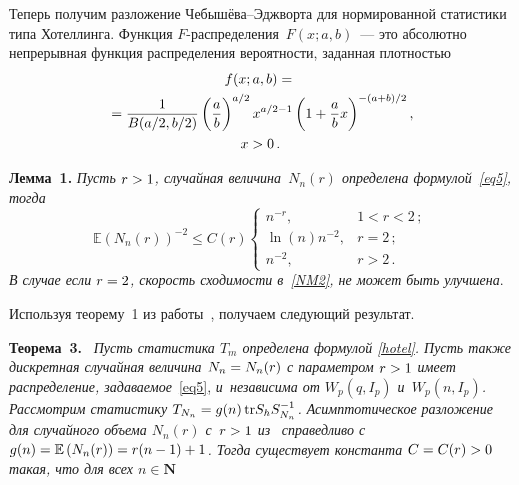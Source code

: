 \begin{multicols}{2}
\vspace*{-2pt}

Теперь получим разложение Че\-бы\-шё\-ва--Эдж\-вор\-та для нормированной статистики типа 
Хотеллинга. Функция $F$-рас\-пре\-де\-ле\-ния~$F(x;a,b)$~--- это абсолютно 
непрерывная функция распределения вероятности, заданная плот\-ностью
\begin{multline*}
f(x;a,b) = {}\\
{}=\displaystyle\frac{\displaystyle 1\mathstrut}{\displaystyle B(a/2,b/2)\mathstrut}\left(\displaystyle\frac{\displaystyle a\mathstrut}{\displaystyle b\mathstrut}\right)^{a/2} x^{a/2-1} 
\left(1+\displaystyle\frac{\displaystyle a\mathstrut}{\displaystyle b\mathstrut}x\right)^{-(a+b)/2},\\
 x>0\,.
\end{multline*}

\vspace*{-6pt}

\noindent
\textbf{Лемма~1.}
\textit{Пусть $r\hm>1$, случайная величина~$N_n(r)$ определена 
формулой~\eqref{eq5}, тогда}
\begin{equation}
\label{NM2}
\mathbb{E}\left(N_n(r)\right)^{- 2} \leq C(r) 
\begin{cases} 
n^{- r}, &  1 < r < 2\,;\\ 
\ln(n)  n^{- 2}, &   r  = 2\,; \\
 n^{-2}, & r > 2\,.
 \end{cases}
\end{equation}
\textit{В случае если $r\hm=2$, скорость сходимости в~\eqref{NM2}, не может быть улучшена}.


\smallskip

Используя теорему~1 из работы~\cite{CMU}, получаем следующий результат.



\smallskip

\noindent
\textbf{Теорема~3.}\
\textit{Пусть статистика $T_m$ определена формулой \eqref{hotel}.
Пусть также дискретная случайная величина $N_n\hm=N_n(r)$ с параметром $r \hm> 1$ 
имеет распределение, задаваемое}~\eqref{eq5}, \textit{и~независима от $W_p(q, I_p)$ 
и~$W_p(n, I_p)$.
Рассмотрим статистику $T_{N_n} \hm= g(n) \,\mathrm{tr} S_h S^{-1}_{N_n}$.  
Асимптотическое разложение для случайного объема $N_n(r)$ с~$r\hm>1$ из}~\cite[теорема~1]{CMU} 
\textit{справедливо с $g(n) = \mathbb{E}\left(N_n(r)\right) = r(n\hm-
1)\hm+1$. Тогда существует константа $C\hm=C(r)\hm>0$  такая, что для всех $n \in 
\mathbf{N}$}

\end{multicols}

